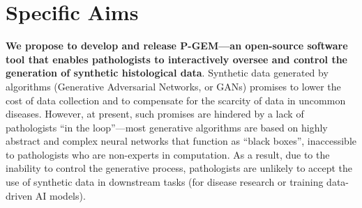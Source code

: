 \section*{Specific Aims}
\vspace{-1em}





{\bf We propose to develop and release P-GEM---an open-source software tool that enables pathologists to interactively oversee and control the generation of synthetic histological data}.
Synthetic data generated by algorithms (\eg Generative Adversarial Networks, or GANs) promises to lower the cost of data collection and to compensate for the scarcity of data in uncommon diseases.
However, at present, such promises are hindered by a lack of pathologists ``in the loop''---most generative algorithms are based on highly abstract and complex neural networks that function as ``black boxes'', inaccessible to pathologists who are non-experts in computation.
As a result, due to the inability to control the generative process, pathologists are unlikely to accept the use of synthetic data in downstream tasks (\eg for disease research or training data-driven AI models).



